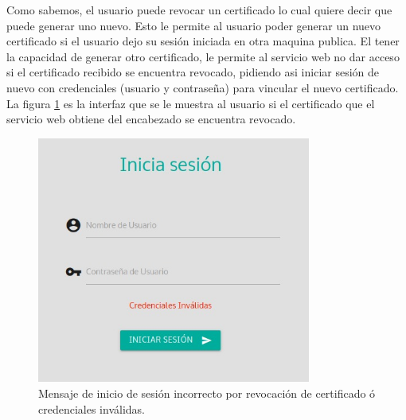 \documentclass[12pt, a4paper, titlepage]{report}
\begin{document}
    			Como sabemos, el usuario puede revocar un certificado lo cual quiere decir que puede generar uno nuevo. Esto le permite al usuario poder generar un nuevo certificado si el usuario dejo su sesión iniciada en otra maquina publica. El tener la capacidad de generar otro certificado, le permite al servicio web no dar acceso si el certificado recibido se encuentra revocado, pidiendo asi iniciar sesión de nuevo con credenciales (usuario y contraseña) para vincular el nuevo certificado. 
    			La figura \ref{fig:UI_certificadoRevocado} es la interfaz que se le muestra al usuario si el certificado que el servicio web obtiene del encabezado se encuentra revocado.
    			
    			\begin{figure}[H]
    				\begin{center}	\includegraphics[width=9cm]{./imagenes/Disenio/Componente_1/UI_certificadoRevocado.jpeg}
    					\caption[Mensaje de error]{Mensaje de inicio de sesión incorrecto por revocación de certificado ó credenciales inválidas.}
    				\label{fig:UI_certificadoRevocado}
    				\end{center}
    			\end{figure}
            
\end{document}
